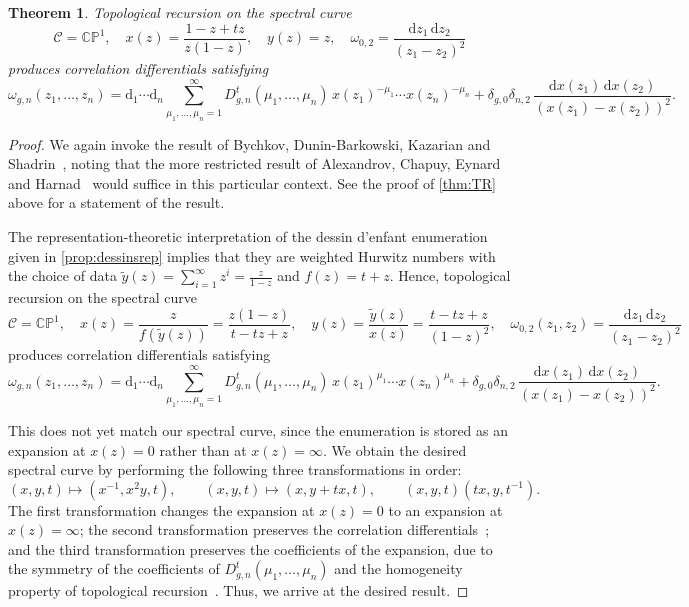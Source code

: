 \documentclass[a4paper]{article}
\theoremstyle{plain}
\newtheorem{theorem}{Theorem}
\numberwithin{theorem}{section}
\theoremstyle{definition}
\theoremstyle{remark}
\newcommand{\dd}{\mathrm{d}}
\begin{document}
\begin{theorem} \label{thm:dessinTR}
Topological recursion on the spectral curve
\[
\mathcal{C} = \mathbb{CP}^1, \quad x(z) = \frac{1 - z + tz}{z(1-z)}, \quad y(z) = z, \quad \omega_{0,2} = \frac{\dd z_1 \, \dd z_2}{(z_1-z_2)^2}
\]
produces correlation differentials satisfying
\[
\omega_{g,n}(z_1, \ldots, z_n) = \dd_1 \cdots \dd_n \sum_{\mu_1, \ldots, \mu_n=1}^{\infty} D^t_{g,n}(\mu_1, \ldots, \mu_n) \, x(z_1)^{-\mu_1} \cdots x(z_n)^{-\mu_n} + \delta_{g,0} \delta_{n,2} \, \frac{\dd x(z_1) \, \dd x(z_2)}{\left( x(z_1) - x(z_2) \right)^2}.
\]
\end{theorem}


\begin{proof}
We again invoke the result of Bychkov, Dunin-Barkowski, Kazarian and Shadrin~\cite{BDKS21}, noting that the more restricted result of Alexandrov, Chapuy, Eynard and Harnad~\cite{ACEH20} would suffice in this particular context. See the proof of \cref{thm:TR} above for a statement of the result.


The representation-theoretic interpretation of the dessin d'enfant enumeration given in \cref{prop:dessinsrep} implies that they are weighted Hurwitz numbers with the choice of data $\tilde{y}(z) = \sum_{i=1}^\infty z^i = \frac{z}{1-z}$ and $f(z) = t + z$. Hence, topological recursion on the spectral curve
\[
\mathcal{C} = \mathbb{CP}^1, \quad x(z) = \frac{z}{f(\tilde{y}(z))} = \frac{z(1-z)}{t-tz+z}, \quad y(z) = \frac{\tilde{y}(z)}{x(z)} = \frac{t-tz+z}{(1-z)^2}, \quad \omega_{0,2}(z_1, z_2) = \frac{\dd z_1 \, \dd z_2}{(z_1 - z_2)^2}
\]
produces correlation differentials satisfying
\[
\omega_{g,n}(z_1, \ldots, z_n) = \dd_1 \cdots \dd_n \sum_{\mu_1, \ldots, \mu_n=1}^{\infty} D^t_{g,n}(\mu_1, \ldots, \mu_n) \, x(z_1)^{\mu_1} \cdots x(z_n)^{\mu_n} + \delta_{g,0} \delta_{n,2} \, \frac{\dd x(z_1) \, \dd x(z_2)}{\left( x(z_1) - x(z_2) \right)^2}.
\]


This does not yet match our spectral curve, since the enumeration is stored as an expansion at $x(z) = 0$ rather than at $x(z) = \infty$. We obtain the desired spectral curve by performing the following three transformations in order:
\[
(x, y, t) \mapsto (x^{-1}, x^2y, t), \qquad (x, y, t) \mapsto (x, y+tx, t), \qquad (x, y, t) (tx, y, t^{-1}).
\]
The first transformation changes the expansion at $x(z) = 0$ to an expansion at $x(z) = \infty$; the second transformation preserves the correlation differentials~\cite[Section~4.2]{eyn-ora09}; and the third transformation preserves the coefficients of the expansion, due to the symmetry of the coefficients of $D^t_{g,n}(\mu_1, \ldots, \mu_n)$ and the homogeneity property of topological recursion~\cite[Section~4.1]{eyn-ora09}. Thus, we arrive at the desired result.
\end{proof}
\end{document}
